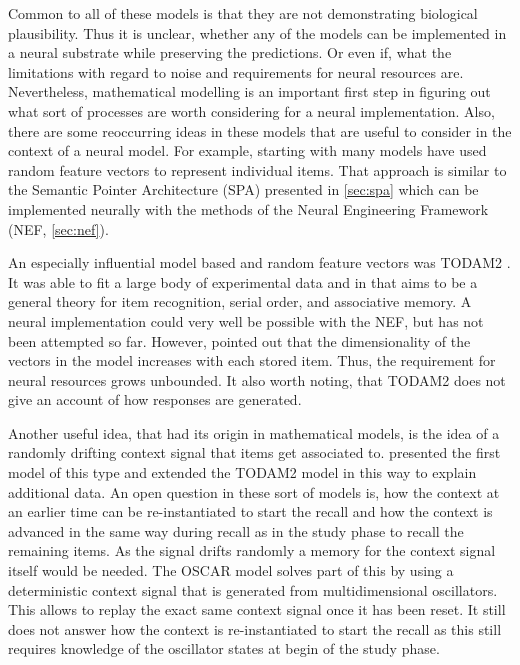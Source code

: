 Common to all of these models is that they are not demonstrating biological plausibility.
Thus it is unclear, whether any of the models can be implemented in a neural substrate while preserving the predictions.
Or even if, what the limitations with regard to noise and requirements for neural resources are.
Nevertheless, mathematical modelling is an important first step in figuring out what sort of processes are worth considering for a neural implementation.
Also, there are some reoccurring ideas in these models that are useful to consider in the context of a neural model.
For example, starting with \textcite{Anderson1973} many models have used random feature vectors to represent individual items.
That approach is similar to the Semantic Pointer Architecture (SPA) presented in \cref{sec:spa} which can be implemented neurally with the methods of the Neural Engineering Framework (NEF, \cref{sec:nef}).

An especially influential model based and random feature vectors was TODAM2 \parencite{Murdock1993}.
It was able to fit a large body of experimental data and in that aims to be a general theory for item recognition, serial order, and associative memory.
A neural implementation could very well be possible with the NEF, but has not been attempted so far.
However, \textcite{Choo2010} pointed out that the dimensionality of the vectors in the model increases with each stored item.
Thus, the requirement for neural resources grows unbounded.
It also worth noting, that TODAM2 does not give an account of how responses are generated.

Another useful idea, that had its origin in mathematical models, is the idea of a randomly drifting context signal that items get associated to.
\Textcite{Estes1955} presented the first model of this type and \textcite{Murdock1997} extended the TODAM2 model in this way to explain additional data.
An open question in these sort of models is, how the context at an earlier time can be re-instantiated to start the recall and how the context is advanced in the same way during recall as in the study phase to recall the remaining items.
As the signal drifts randomly a memory for the context signal itself would be needed.
The OSCAR model \parencite{Brown2000} solves part of this by using a deterministic context signal that is generated from multidimensional oscillators.
This allows to replay the exact same context signal once it has been reset.
It still does not answer how the context is re-instantiated to start the recall as this still requires knowledge of the oscillator states at begin of the study phase.

